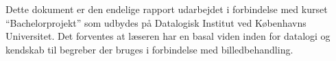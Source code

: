 {
{\sffamily Dette dokument er den endelige rapport udarbejdet i forbindelse med
kurset ``Bachelorprojekt'' som udbydes på Datalogisk Institut ved
Københavns Universitet. Det forventes at læseren har en basal viden
inden for datalogi og kendskab til begreber der bruges i forbindelse med
billedbehandling.
}
}


